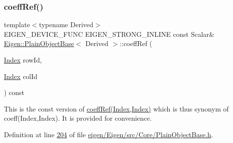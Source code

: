 \mbox{\label{class_eigen_1_1_plain_object_base_ab1b33ee10e4c72ec5cf354d511900e62}} 
\subsubsection{\texorpdfstring{coeff\+Ref()}{coeffRef()}\hspace{0.1cm}{\footnotesize\ttfamily [5/8]}}
{\footnotesize\ttfamily template$<$typename Derived$>$ \\
E\+I\+G\+E\+N\+\_\+\+D\+E\+V\+I\+C\+E\+\_\+\+F\+U\+NC E\+I\+G\+E\+N\+\_\+\+S\+T\+R\+O\+N\+G\+\_\+\+I\+N\+L\+I\+NE const Scalar\& \hyperlink{class_eigen_1_1_plain_object_base}{Eigen\+::\+Plain\+Object\+Base}$<$ Derived $>$\+::coeff\+Ref (\begin{DoxyParamCaption}\item[{\hyperlink{namespace_eigen_a62e77e0933482dafde8fe197d9a2cfde}{Index}}]{row\+Id,  }\item[{\hyperlink{namespace_eigen_a62e77e0933482dafde8fe197d9a2cfde}{Index}}]{col\+Id }\end{DoxyParamCaption}) const\hspace{0.3cm}{\ttfamily [inline]}}

This is the const version of \hyperlink{class_eigen_1_1_plain_object_base_a25626a55b26a4323565f79d1b7c48ea8}{coeff\+Ref(\+Index,\+Index)} which is thus synonym of coeff(\+Index,\+Index). It is provided for convenience. 

Definition at line \hyperlink{eigen_2_eigen_2src_2_core_2_plain_object_base_8h_source_l00204}{204} of file \hyperlink{eigen_2_eigen_2src_2_core_2_plain_object_base_8h_source}{eigen/\+Eigen/src/\+Core/\+Plain\+Object\+Base.\+h}.

\mbox{\label{class_eigen_1_1_plain_object_base_ab1b33ee10e4c72ec5cf354d511900e62}} 
